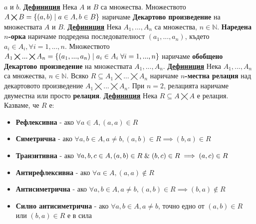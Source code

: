 \documentclass{article}
\begin{document}
$a$ и $b$. \newline\newline
\textbf{\underline{Дефиниция}} Нека $A$ и $B$ са множества. Множеството $A \bigtimes B = \{(a, b) \hspace{0.1cm} | \hspace{0.1cm} a \in A, b \in B\}$
наричаме \textbf{Декартово произведение} на множествата $A$ и $B$. \newline\newline
\textbf{\underline{Дефиниция}}
Нека $A_1,...,A_n$ са множества, $n \in \mathbb{N}$. \textbf{Наредена $n$-орка} наричаме подредена последователност $(a_1, ..., a_n)$, където $a_i \in A_i,
\forall i = 1,...,n$. Множеството $A_1 \bigtimes ... \bigtimes A_n = \{(a_1, ..., a_n) \hspace{0.1cm} | \hspace{0.1cm} a_i \in A_i \hspace{0.1cm} \forall
i = 1,...,n\}$ наричаме \textbf{обобщено Декартово произведение} на множествата $A_1, ..., A_n$. \newline\newline
\textbf{\underline{Дефиниция}}
Нека $A_1,...,A_n$ са множества, $n \in \mathbb{N}$. Всяко $R \subseteq A_1 \bigtimes ... \bigtimes A_n$ наричаме
\textbf{$n$-местна релация} над декартовото произведение $A_1 \bigtimes ... \bigtimes A_n$.
При $n = 2$, релацията наричаме двуместна или просто \textbf{релация}. \newline\newline
\textbf{\underline{Дефиниция}}
Нека $R \subseteq A \bigtimes A$ е релация. Казваме, че $R$ е:
\begin{itemize}
    \item \textbf{Рефлексивна} - ако $\forall a \in A, (a, a) \in R$
    \item \textbf{Симетрична} - ако $\forall a, b \in A, a \neq b, (a, b) \in R \implies (b, a) \in R$
    \item \textbf{Транзитивна} - ако $\forall a, b, c \in A, (a, b) \in R \hspace{0.1cm} \& \hspace{0.1cm} (b, c) \in R \implies (a, c) \in R$
    \item \textbf{Антирефлексивна} - ако $\forall a \in A, (a, a) \notin R$
    \item \textbf{Антисиметрична} - ако $\forall a, b \in A, a \neq b, (a, b) \in R \implies (b, a) \notin R$
    \item \textbf{Силно антисиметрична} - ако $\forall a, b \in A, a \neq b$, точно едно от $(a, b) \in R$ или $(b, a) \in R$ е в сила
\end{itemize}
\end{document}
